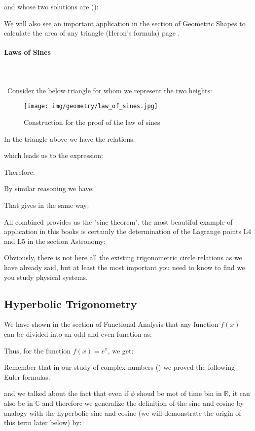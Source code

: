 	and whose two solutions are ():
	
	We will also see an important application in the section of Geometric Shapes to calculate the area of any triangle (Heron's formula) page \pageref{heron formula}.
	
	\paragraph{Laws of Sines}\label{law of sines}\mbox{}\\\\\
	Consider the below triangle for whom we represent the two heights:
	\begin{figure}[H]
	\centering
	\texttt{[image: img/geometry/law\_of\_sines.jpg]}
	\caption{Construction for the proof of the law of sines}
	\end{figure}
	In the triangle above we have the relations:
	
	which leads us to the expression:
	
	Therefore:
	
	By similar reasoning we have:
	
	That gives in the same way:
	
	All combined provides us the "sine theorem", the most beautiful example of application in this books is certainly the determination of the Lagrange points L4 and L5 in the section Astronomy:
	
	Obviously, there is not here all the existing trigonometric circle relations as we have already said, but at least the most important you need to know to find we you study  physical systems.
	
	\subsection{Hyperbolic Trigonometry}\label{hyperbolic trigonometry}
	We have shown in the section of Functional Analysis that any function $f (x)$ can be divided into an odd and even function as:
	
	Thus, for the function $f(x)=e^x$, we get:
	
	Remember that in our study of complex numbers () we proved the following Euler formulas:
	
	and we talked about the fact that even if $\phi$ shoud be mot of time bin in $\mathbb{R}$, it can also be in $\mathbb{C}$ and therefore we generalize the definition of the sine and cosine by analogy with the hyperbolic sine and cosine (we will demonstrate the origin of this term later below) by:
	
